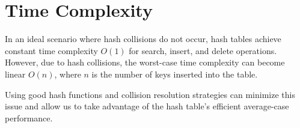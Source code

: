 \section{Time Complexity}

In an ideal scenario where hash collisions do not occur, hash tables achieve constant time complexity $O(1)$ for search, insert, and delete operations. However, due to hash collisions, the worst-case time complexity can become linear $O(n)$, where $n$ is the number of keys inserted into the table. 

Using good hash functions and collision resolution strategies can minimize this issue and allow us to take advantage of the hash table's efficient average-case performance.

